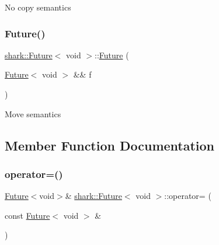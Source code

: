 No copy semantics \hypertarget{structshark_1_1_future_3_01void_01_4_a3ad618247c8f98b53ee259e65c99fe7a}{}\label{structshark_1_1_future_3_01void_01_4_a3ad618247c8f98b53ee259e65c99fe7a} 
\subsubsection{\texorpdfstring{Future()}{Future()}\hspace{0.1cm}{\footnotesize\ttfamily [4/4]}}
{\footnotesize\ttfamily \hyperlink{structshark_1_1_future}{shark\+::\+Future}$<$ void $>$\+::\hyperlink{structshark_1_1_future}{Future} (\begin{DoxyParamCaption}\item[{\hyperlink{structshark_1_1_future}{Future}$<$ void $>$ \&\&}]{f }\end{DoxyParamCaption})}

Move semantics 

\subsection{Member Function Documentation}
\hypertarget{structshark_1_1_future_3_01void_01_4_a6c0e75cc374582c7454cff341b559915}{}\label{structshark_1_1_future_3_01void_01_4_a6c0e75cc374582c7454cff341b559915} 
\subsubsection{\texorpdfstring{operator=()}{operator=()}\hspace{0.1cm}{\footnotesize\ttfamily [1/2]}}
{\footnotesize\ttfamily \hyperlink{structshark_1_1_future}{Future}$<$void$>$\& \hyperlink{structshark_1_1_future}{shark\+::\+Future}$<$ void $>$\+::operator= (\begin{DoxyParamCaption}\item[{const \hyperlink{structshark_1_1_future}{Future}$<$ void $>$ \&}]{ }\end{DoxyParamCaption})\hspace{0.3cm}{\ttfamily [delete]}}

\hypertarget{structshark_1_1_future_3_01void_01_4_aee3b7c5d2cf7c7b6d0a0f34fc1da225f}{}\label{structshark_1_1_future_3_01void_01_4_aee3b7c5d2cf7c7b6d0a0f34fc1da225f} 

